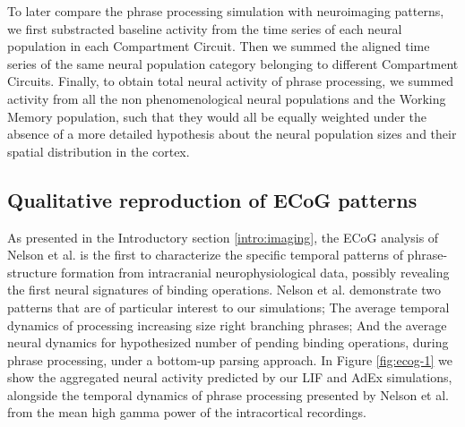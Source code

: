 \documentclass[10pt]{article}
\begin{document}
To later compare the phrase processing simulation with neuroimaging patterns, we first substracted baseline activity from the time series of each neural population in each Compartment Circuit.
Then we summed the aligned time series of the same neural population category belonging to different Compartment Circuits.
Finally, to obtain total neural activity of phrase processing, we summed activity from all the non phenomenological neural populations and the Working Memory population, such that they would all be equally weighted under the absence of a more detailed hypothesis about the neural population sizes and their spatial distribution in the cortex.


\subsection{Qualitative reproduction of ECoG patterns}
{\label{sec:ecog-patterns}}


As presented in the Introductory section \ref{intro:imaging}, the ECoG analysis of Nelson et al.\cite{Nelson_2017} is the first to characterize the specific temporal patterns of phrase-structure formation from intracranial neurophysiological data, possibly revealing the first neural signatures of binding operations.
Nelson et al. demonstrate two patterns that are of particular interest to our simulations; The average temporal dynamics of processing increasing size right branching phrases; And the average neural dynamics for hypothesized number of pending binding operations, during phrase processing, under a bottom-up parsing approach.
In Figure \ref{fig:ecog-1} we show the aggregated neural activity predicted by our LIF and AdEx simulations, alongside the temporal dynamics of phrase processing presented by Nelson et al. from the mean high gamma power of the intracortical recordings.
\end{document}
